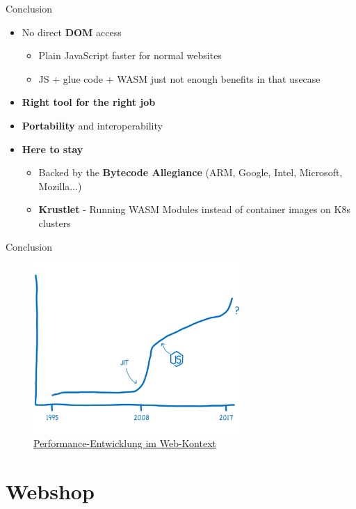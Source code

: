 \documentclass{beamer}
\begin{document}
\begin{frame}{Conclusion}
\begin{itemize}
    \item No direct \textbf{DOM} access 
    \begin{itemize} 
        \item Plain JavaScript faster for normal websites 
        \item JS + glue code + WASM just not enough benefits in that usecase 
    \end{itemize}
    \item \textbf{Right tool for the right job}
    \item \textbf{Portability} and interoperability
    \item \textbf{Here to stay}
    \begin{itemize}
        \item Backed by the \textbf{Bytecode Allegiance} (ARM, Google, Intel, Microsoft, Mozilla...)
        \item \textbf{Krustlet} - Running WASM Modules instead of container images on K8s clusters
    \end{itemize}
\end{itemize}
\end{frame}

\begin{frame}{Conclusion}
    \begin{figure}
        \includegraphics[width=0.7\textwidth,height=0.7\textheight]{./images/perf_history.png}
        \caption{\href{https://hacks.mozilla.org/2017/02/a-cartoon-intro-to-webassembly/}{Performance-Entwicklung im Web-Kontext}}
    \end{figure}
\end{frame}

\section{Webshop}
    
\end{document}

